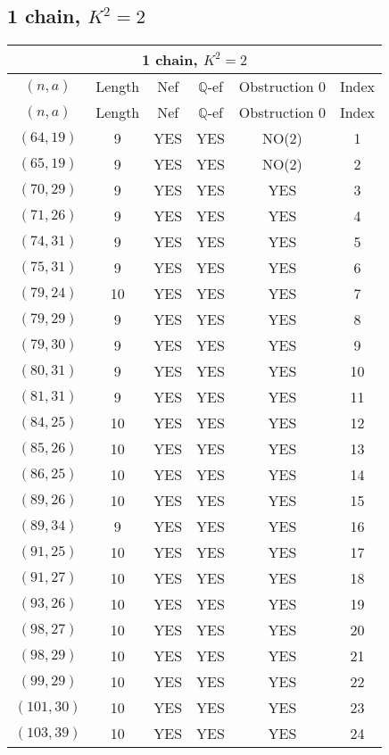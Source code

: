 \subsection{1 chain, \(K^2 = 2\)}
\begin{longtable}{|c|c|c|c|c|c|}
\hline
\multicolumn{6}{|c|}{1 chain, $K^2 = 2$}\\
\hline
$(n,a)$ & Length & Nef & $\mathbb Q$-ef & Obstruction 0 & Index\\
\hline
\endfirsthead

\hline
$(n,a)$ & Length & Nef & $\mathbb Q$-ef & Obstruction 0 & Index\\
\hline
\endhead
\hline
\endfoot

$(64, 19)$ & 9 & YES & YES & NO(2) & 1\\
$(65, 19)$ & 9 & YES & YES & NO(2) & 2\\
$(70, 29)$ & 9 & YES & YES & YES & 3\\
$(71, 26)$ & 9 & YES & YES & YES & 4\\
$(74, 31)$ & 9 & YES & YES & YES & 5\\
$(75, 31)$ & 9 & YES & YES & YES & 6\\
$(79, 24)$ & 10 & YES & YES & YES & 7\\
$(79, 29)$ & 9 & YES & YES & YES & 8\\
$(79, 30)$ & 9 & YES & YES & YES & 9\\
$(80, 31)$ & 9 & YES & YES & YES & 10\\
$(81, 31)$ & 9 & YES & YES & YES & 11\\
$(84, 25)$ & 10 & YES & YES & YES & 12\\
$(85, 26)$ & 10 & YES & YES & YES & 13\\
$(86, 25)$ & 10 & YES & YES & YES & 14\\
$(89, 26)$ & 10 & YES & YES & YES & 15\\
$(89, 34)$ & 9 & YES & YES & YES & 16\\
$(91, 25)$ & 10 & YES & YES & YES & 17\\
$(91, 27)$ & 10 & YES & YES & YES & 18\\
$(93, 26)$ & 10 & YES & YES & YES & 19\\
$(98, 27)$ & 10 & YES & YES & YES & 20\\
$(98, 29)$ & 10 & YES & YES & YES & 21\\
$(99, 29)$ & 10 & YES & YES & YES & 22\\
$(101, 30)$ & 10 & YES & YES & YES & 23\\
$(103, 39)$ & 10 & YES & YES & YES & 24\\

\end{longtable}
